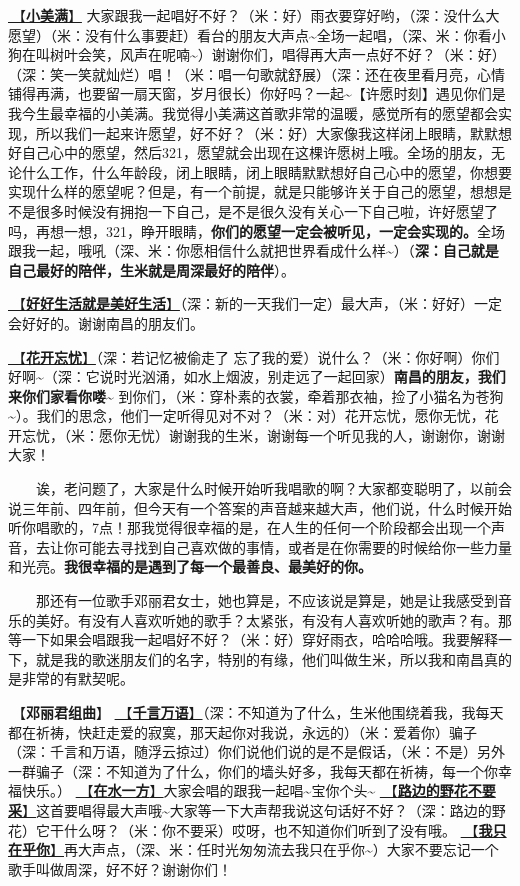 \documentclass[]{ctexbook}
\begin{document}
\hyperref[happy-ending]{🎵【\textbf{小美满}】} 大家跟我一起唱好不好？（米：好）雨衣要穿好哟，（深：没什么大愿望）（米：没有什么事要赶）看台的朋友大声点\textasciitilde 全场一起唱，（深、米：你看小狗在叫树叶会笑，风声在呢喃\textasciitilde）谢谢你们，唱得再大声一点好不好？（米：好）（深：笑一笑就灿烂）唱！（米：唱一句歌就舒展）（深：还在夜里看月亮，心情铺得再满，也要留一扇天窗，岁月很长）你好吗？一起\textasciitilde【许愿时刻】遇见你们是我今生最幸福的小美满。我觉得小美满这首歌非常的温暖，感觉所有的愿望都会实现，所以我们一起来许愿望，好不好？（米：好）大家像我这样闭上眼睛，默默想好自己心中的愿望，然后321，愿望就会出现在这棵许愿树上哦。全场的朋友，无论什么工作，什么年龄段，闭上眼睛，闭上眼睛默默想好自己心中的愿望，你想要实现什么样的愿望呢？但是，有一个前提，就是只能够许关于自己的愿望，想想是不是很多时候没有拥抱一下自己，是不是很久没有关心一下自己啦，许好愿望了吗，再想一想，321，睁开眼睛，\textbf{你们的愿望一定会被听见，一定会实现的。}全场跟我一起，哦吼（深、米：你愿相信什么就把世界看成什么样\textasciitilde）（\textbf{深：自己就是自己最好的陪伴，生米就是周深最好的陪伴}）。

\hyperref[live-happy-life-happy]{🎵【\textbf{好好生活就是美好生活}】}（深：新的一天我们一定）最大声，（米：好好）一定会好好的。谢谢南昌的朋友们。

\hyperref[no-worries]{🎵【\textbf{花开忘忧}】}（深：若记忆被偷走了 忘了我的爱）说什么？（米：你好啊）你们好啊\textasciitilde（深：它说时光汹涌，如水上烟波，别走远了一起回家）\textbf{南昌的朋友，我们来你们家看你喽\textasciitilde{}} 到你们，（米：穿朴素的衣裳，牵着那衣袖，捡了小猫名为苍狗\textasciitilde）。我们的思念，他们一定听得见对不对？（米：对）花开忘忧，愿你无忧，花开忘忧，（米：愿你无忧）谢谢我的生米，谢谢每一个听见我的人，谢谢你，谢谢大家！

  诶，老问题了，大家是什么时候开始听我唱歌的啊？大家都变聪明了，以前会说三年前、四年前，但今天有一个答案的声音越来越大声，他们说，什么时候开始听你唱歌的，7点！那我觉得很幸福的是，在人生的任何一个阶段都会出现一个声音，去让你可能去寻找到自己喜欢做的事情，或者是在你需要的时候给你一些力量和光亮。\textbf{我很幸福的是遇到了每一个最善良、最美好的你。}

  那还有一位歌手邓丽君女士，她也算是，不应该说是算是，她是让我感受到音乐的美好。有没有人喜欢听她的歌手？太紧张，有没有人喜欢听她的歌声？有。那等一下如果会唱跟我一起唱好不好？（米：好）穿好雨衣，哈哈哈哦。我要解释一下，就是我的歌迷朋友们的名字，特别的有缘，他们叫做生米，所以我和南昌真的是非常的有默契呢。

🎵【\textbf{邓丽君组曲}】
\hyperref[thousands-of-words]{🎵【\textbf{千言万语}】}（深：不知道为了什么，生米他围绕着我，我每天都在祈祷，快赶走爱的寂寞，那天起你对我说，永远的）（米：爱着你）骗子（深：千言和万语，随浮云掠过）你们说他们说的是不是假话，（米：不是）另外一群骗子（深：不知道为了什么，你们的墙头好多，我每天都在祈祷，每一个你幸福快乐。）
\hyperref[on-the-water-side]{🎵【\textbf{在水一方}】}大家会唱的跟我一起唱\textasciitilde 宝你个头\textasciitilde{}
\hyperref[only-with-me]{🎵【\textbf{路边的野花不要采}】}这首要唱得最大声哦\textasciitilde 大家等一下大声帮我说这句话好不好？（深：路边的野花）它干什么呀？（米：你不要采）哎呀，也不知道你们听到了没有哦。
\hyperref[only-you]{🎵【\textbf{我只在乎你}】}再大声点，（深、米：任时光匆匆流去我只在乎你\textasciitilde）大家不要忘记一个歌手叫做周深，好不好？谢谢你们！
\end{document}
